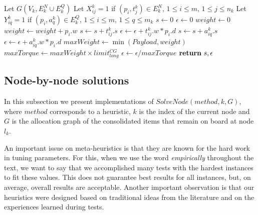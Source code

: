 \documentclass[preprint,authoryear]{elsarticle}
\begin{document}
\begin{algorithm}[H]
	\caption{$ScoreAndDeviation(k, G)$}  \label{alg:eval}
	
	\begin{algorithmic}[1]
		\State Let $G(V_k, E^N_k \cup E^Q_k)$
		\State Let $X_{ij}^k = 1$ if $(p_i, t_j^k) \in E^N_k$, $1 \leq i \leq m$, $1 \leq j \leq n_k$
		\State Let $Y_{iq}^k = 1$ if $(p_i, a_q^k) \in E^Q_k$, $1 \leq i \leq m$, $1 \leq q \leq m_k$
		\State $s \gets 0$
		\State $\epsilon \gets 0$
		\State $weight \gets 0$
			\label{eval:loop1}
			\State $weight \gets weight + p_i.w$		
					\State $s \gets s + t_{ij}^k.s$ \label{eval:score1}
					\State $\epsilon \gets \epsilon + t_{ij}^k.w * p_i.d$ \label{eval:eps1}
				\EndIf
			\EndFor				
					\State $s \gets s + a_{iq}^k.s$   \label{eval:score2}
					\State $\epsilon \gets \epsilon + a_{iq}^k.w * p_i.d$  \label{eval:eps2}
				\EndIf
			\EndFor	   \label{eval:loop2}
		\EndFor
		\State $maxWeight \gets \min(Payload, weight)$ \label{eval:torque1}
		\State $maxTorque \gets maxWeight \times limit^{CG}_{long}$
		\State $\epsilon \gets \epsilon/maxTorque$ \label{eval:torque2}
		\State ${\bf return}\ s, \epsilon$	
	\end{algorithmic}
\end{algorithm}


\subsection{Node-by-node solutions}
\label{methods}


In this subsection we present implementations of $SolveNode(method,k, G)$, where $method$\/ corresponds to a heuristic, $k$\/ is the index of the current node and $G$\/ is the allocation graph of the consolidated items that remain on board at node $l_k$.

An important issue on meta-heuristics is that they are known for the hard work in tuning parameters. For this, when we use the word {\it empirically}\/ throughout the text, we want to say that we accomplished many tests with the hardest instances to fit these values. This does not guarantee best results for all instances, but, on average, overall results are acceptable. Another important observation is that our heuristics were designed based on traditional ideas from the literature \cite{Fidanova2006} and on the experiences learned during tests.
\end{document}
